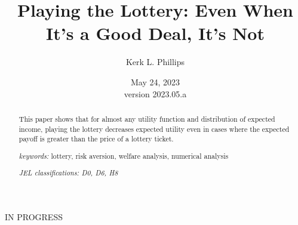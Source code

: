 \documentclass[letterpaper,12pt]{article}
\numberwithin{equation}{section}
\numberwithin{figure}{section}
\numberwithin{table}{section}
\begin{document}
\begin{titlepage}
	\title{Playing the Lottery: Even When It's a Good Deal, It's Not}

	\author[1]{Kerk L. Phillips}



	\date{May 24, 2023\\
	\small{version 2023.05.a}}

	
	\maketitle

	\vspace{-0.3in}
	\begin{abstract}
	\small{
	This paper shows that for almost any utility function and distribution of expected income, playing the lottery decreases expected utility even in cases where the expected payoff is greater than the price of a lottery ticket.

	\vspace{0.1in}

	\textit{keywords:} lottery, risk aversion, welfare analysis, numerical analysis

	\vspace{0.1in}

	\textit{JEL classifications: D0, D6, H8} }
	\end{abstract}

	\centering
	IN PROGRESS

	\thispagestyle{empty}
\end{titlepage}
\end{document}
